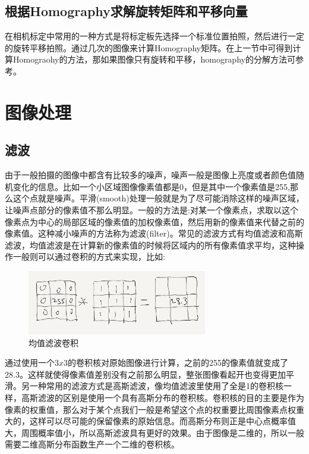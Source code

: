 \documentclass[12pt]{book}
\begin{document}
\subsection{根据Homography求解旋转矩阵和平移向量}
在相机标定中常用的一种方式是将标定板先选择一个标准位置拍照，然后进行一定的旋转平移拍照。通过几次的图像来计算Homography矩阵。在上一节中可得到计算Homograohy的方法，那如果图像只有旋转和平移，homography的分解方法可参考\cite{malis2007deeper}。

\section{图像处理}
\subsection{滤波}
由于一般拍摄的图像中都含有比较多的噪声，噪声一般是图像上亮度或者颜色值随机变化的信息。比如一个小区域图像像素值都是0，但是其中一个像素值是255,那么这个点就是噪声。平滑(smooth)处理一般就是为了尽可能消除这样的噪声区域，让噪声点部分的像素值不那么明显。一般的方法是:对某一个像素点，求取以这个像素点为中心的局部区域的像素值的加权像素值，然后用新的像素值来代替之前的像素值。这种减小噪声的方法称为滤波(filter)。常见的滤波方式有均值滤波和高斯滤波，均值滤波是在计算新的像素值的时候将区域内的所有像素值求平均，这种操作一般则可以通过卷积的方式来实现，比如:
\begin{figure}[H]
	\centering
	\includegraphics[width=0.7\textwidth]{images/mean-filter.png}
	\caption{均值滤波卷积}
	\label{mean-filter} 
\end{figure}
通过使用一个$3x3$的卷积核对原始图像进行计算，之前的255的像素值就变成了28.3。这样就使得像素值差别没有之前那么明显，整张图像看起开也变得更加平滑。另一种常用的滤波方式是高斯滤波，像均值滤波里使用了全是1的卷积核一样，高斯滤波的区别是使用一个具有高斯分布的卷积核。卷积核的目的主要是作为像素的权重值，那么对于某个点我们一般是希望这个点的权重要比周围像素点权重大的，这样可以尽可能的保留像素的原始信息。而高斯分布则正是中心点概率值大，周围概率值小，所以高斯滤波具有更好的效果。由于图像是二维的，所以一般需要二维高斯分布函数生产一个二维的卷积核。

\newpage
\end{document}
